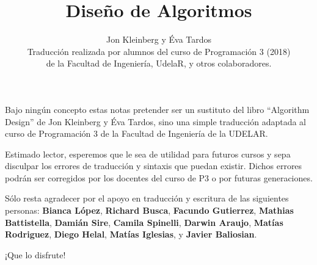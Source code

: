 \documentclass[a4paper, 12pt]{book}
\title{Diseño de Algoritmos}
\author{Jon Kleinberg y Éva Tardos\\ Traducción realizada por alumnos del curso de Programación 3 (2018)\\ de la Facultad de Ingeniería, UdelaR, y otros colaboradores.}
\theoremstyle{dotless}
\begin{document}
\maketitle	








\chapter*{}

Bajo ningún concepto estas notas pretender ser un sustituto del libro ``Algorithm Design'' de Jon Kleinberg y Éva Tardos, sino una simple traducción adaptada al curso de Programación 3 de la Facultad de Ingeniería de la UDELAR. 

Estimado lector, esperemos que le sea de utilidad para futuros cursos y sepa disculpar los errores de traducción y sintaxis que puedan existir. Dichos errores podrán ser corregidos por los docentes del curso de P3 o por futuras generaciones.

Sólo resta agradecer por el apoyo en traducción y escritura de las siguientes personas: \textbf{Bianca López}, \textbf{Richard Busca}, \textbf{Facundo Gutierrez}, \textbf{Mathias Battistella}, \textbf{Damián Sire}, \textbf{Camila Spinelli}, \textbf{Darwin Araujo},  \textbf{Matías Rodriguez}, \textbf{Diego Helal}, \textbf{Matías Iglesias}, y \textbf{Javier Baliosian}.


\begin{center}
\huge{¡Que lo disfrute!}
\end{center}


\tableofcontents

\end{document}
